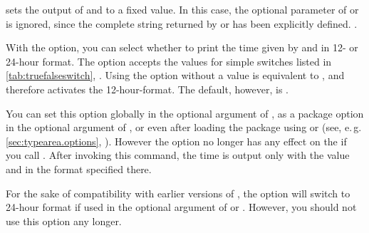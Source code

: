 \begin{Declaration}%
\end{Declaration}%
 sets the output of  and
 to a fixed value. In this case, the optional
parameter of  or 
is ignored, since the complete string returned by
 or  has been
explicitly defined. .%
\EndIndexGroup


\begin{Declaration}
\end{Declaration}%
%
With the  option, you can
select whether to print the time given by  and
 in 12- or 24-hour format. The option accepts
the values for simple switches listed in \autoref{tab:truefalseswitch},
. Using the option without a value is
equivalent to , and therefore activates the
12-hour-format. The default, however, is .

You can set this option globally in the optional argument of
, as a package option in the optional
argument of , or even after loading the
package using  or
 (see, e.\,g. \autoref{sec:typearea.options},
). However the option no longer has any
effect on the if you call . After invoking this
command, the time is output only with the value and in the format specified
there.

For the sake of compatibility with earlier versions of
, the option  will switch to 24-hour format if
used in the optional argument of  or .
However, you should not use this option any longer.%
\EndIndexGroup
%
\EndIndexGroup

\endinput

